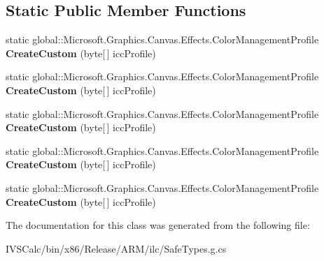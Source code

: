 \subsection*{Static Public Member Functions}
\begin{DoxyCompactItemize}
\item 
\mbox{\label{class_microsoft_1_1_graphics_1_1_canvas_1_1_effects_1_1_color_management_profile_af199e9b20657429b6ae90ec822edeb99}} 
static global\+::\+Microsoft.\+Graphics.\+Canvas.\+Effects.\+Color\+Management\+Profile {\bfseries Create\+Custom} (byte\mbox{[}$\,$\mbox{]} icc\+Profile)
\item 
\mbox{\label{class_microsoft_1_1_graphics_1_1_canvas_1_1_effects_1_1_color_management_profile_af199e9b20657429b6ae90ec822edeb99}} 
static global\+::\+Microsoft.\+Graphics.\+Canvas.\+Effects.\+Color\+Management\+Profile {\bfseries Create\+Custom} (byte\mbox{[}$\,$\mbox{]} icc\+Profile)
\item 
\mbox{\label{class_microsoft_1_1_graphics_1_1_canvas_1_1_effects_1_1_color_management_profile_af199e9b20657429b6ae90ec822edeb99}} 
static global\+::\+Microsoft.\+Graphics.\+Canvas.\+Effects.\+Color\+Management\+Profile {\bfseries Create\+Custom} (byte\mbox{[}$\,$\mbox{]} icc\+Profile)
\item 
\mbox{\label{class_microsoft_1_1_graphics_1_1_canvas_1_1_effects_1_1_color_management_profile_af199e9b20657429b6ae90ec822edeb99}} 
static global\+::\+Microsoft.\+Graphics.\+Canvas.\+Effects.\+Color\+Management\+Profile {\bfseries Create\+Custom} (byte\mbox{[}$\,$\mbox{]} icc\+Profile)
\item 
\mbox{\label{class_microsoft_1_1_graphics_1_1_canvas_1_1_effects_1_1_color_management_profile_af199e9b20657429b6ae90ec822edeb99}} 
static global\+::\+Microsoft.\+Graphics.\+Canvas.\+Effects.\+Color\+Management\+Profile {\bfseries Create\+Custom} (byte\mbox{[}$\,$\mbox{]} icc\+Profile)
\end{DoxyCompactItemize}


The documentation for this class was generated from the following file\+:\begin{DoxyCompactItemize}
\item 
I\+V\+S\+Calc/bin/x86/\+Release/\+A\+R\+M/ilc/Safe\+Types.\+g.\+cs\end{DoxyCompactItemize}
